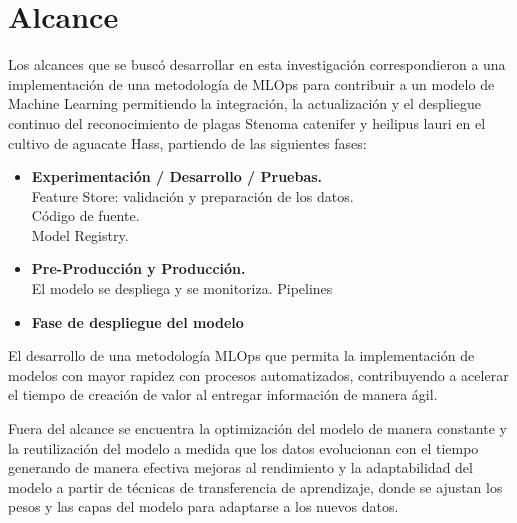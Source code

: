 \section{Alcance}
Los alcances que se buscó desarrollar en esta investigación correspondieron a una implementación de una metodología de MLOps para contribuir a un modelo de Machine Learning permitiendo la integración, la actualización y el despliegue continuo del reconocimiento de plagas Stenoma catenifer y heilipus lauri en el cultivo de aguacate Hass, partiendo de las siguientes fases:

\begin{itemize}
  \item \textbf{Experimentación / Desarrollo / Pruebas.}\\
    Feature Store: validación y preparación de los datos.\\
    Código de fuente.\\
    Model Registry.
  \item \textbf{Pre-Producción y Producción.}\\
    El modelo se despliega y se monitoriza.
    Pipelines
  \item \textbf{Fase de despliegue del modelo}
\end{itemize}

El desarrollo de una metodología MLOps que permita la implementación de modelos con mayor rapidez con procesos automatizados, contribuyendo a acelerar el tiempo de creación de valor al entregar información de manera ágil.

Fuera del alcance se encuentra la optimización del modelo de manera constante y la reutilización del modelo a medida que los datos evolucionan con el tiempo generando de manera efectiva mejoras al rendimiento y la adaptabilidad del modelo a partir de técnicas de transferencia de aprendizaje, donde se ajustan los pesos y las capas del modelo para adaptarse a los nuevos datos.


